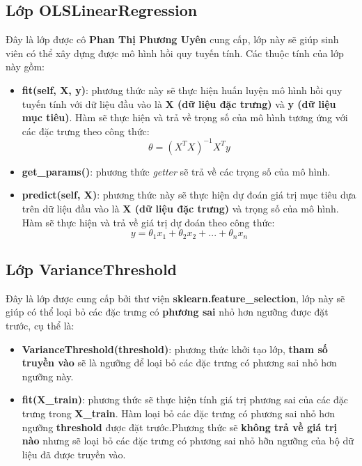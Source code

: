 \documentclass{report}
\begin{document}
\subsection{Lớp OLSLinearRegression}\label{sec:olslinearregression}
    Đây là lớp được cô \textbf{Phan Thị Phương Uyên} cung cấp, lớp này sẽ giúp sinh viên có thể xây dựng được mô hình hồi quy tuyến tính. Các thuộc tính của lớp này gồm:
    \begin{itemize}
        \item \textbf{fit(self, X, y)}: phương thức này sẽ thực hiện huấn luyện mô hình hồi quy tuyến tính với dữ liệu đầu vào là \textbf{X (dữ liệu đặc trưng)} và \textbf{y (dữ liệu mục tiêu)}. Hàm sẽ thực hiện và trả về trọng số của mô hình tương ứng với các đặc trưng theo công thức:
        \begin{equation}
            \theta = (X^TX)^{-1}X^Ty
        \end{equation}

        \item \textbf{get\_params()}: phương thức \textit{getter} sẽ trả về các trọng số của mô hình.
        
        \item \textbf{predict(self, X)}: phương thức này sẽ thực hiện dự đoán giá trị mục tiêu dựa trên dữ liệu đầu vào là \textbf{X (dữ liệu đặc trưng)} và trọng số của mô hình. Hàm sẽ thực hiện và trả về giá trị dự đoán theo công thức:
        \begin{equation}
            y = \theta_1x_1 + \theta_2x_2 + ... + \theta_nx_n
        \end{equation}
    \end{itemize}

\subsection{Lớp VarianceThreshold}
Đây là lớp được cung cấp bởi thư viện \textbf{sklearn.feature\_selection}, lớp này sẽ giúp có thể loại bỏ các đặc trưng có \textbf{phương sai} nhỏ hơn ngưỡng được đặt trước, cụ thể là:
    \begin{itemize}
        \item \textbf{VarianceThreshold(threshold)}: phương thức khởi tạo lớp, \textbf{tham số truyền vào} sẽ là ngưỡng để loại bỏ các đặc trưng có phương sai nhỏ hơn ngưỡng này.
        \item \textbf{fit(X\_train)}: phương thức sẽ thực hiện tính giá trị phương sai của các đặc trưng trong \textbf{X\_train}.
        Hàm loại bỏ các đặc trưng có phương sai nhỏ hơn ngưỡng \textbf{threshold} được đặt trước.Phương thức sẽ \textbf{không trả về giá trị nào} nhưng sẽ loại bỏ các đặc trưng có phương sai nhỏ hỡn ngưỡng của bộ dữ liệu đã được truyền vào.
    \end{itemize}
\end{document}
